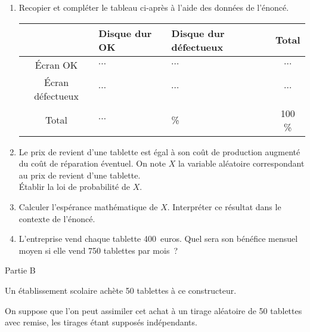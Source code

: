 \begin{enumerate}
     \item %
     Recopier et compléter le tableau ci-après à l'aide des données de l'énoncé.
     \begin{center}
          \begin{extern}%
               \renewcommand\arraystretch{1.5}
               \begin{tabular}{|c|p{2cm}|p{2cm}|c|}
                    \hline
                    $\ $ & \centering Disque dur OK & \centering Disque dur défectueux & Total \\
                    \hline
                    \'Ecran OK & \centering  $\cdots$ & \centering $\cdots$ & $\cdots$ \\
                    \hline
                    \'Ecran défectueux & \centering  $\cdots$ & \centering $\cdots$ & $\cdots$ \\
                    \hline
                    Total & \centering $\cdots$ & \centering 3\% & 100 \% \\
                    \hline
               \end{tabular}
          \end{extern}
     \end{center}
     \item %
     Le prix de revient d'une tablette est égal à son coût de production augmenté du coût de réparation éventuel.
     On note $X$ la variable aléatoire correspondant au prix de revient d'une tablette.\\
     \'Etablir la loi de probabilité de $X$.
     \item %
     Calculer l'espérance mathématique de $X$. Interpréter ce résultat dans le contexte de l'énoncé.
     \item %
     L'entreprise vend chaque tablette 400~euros. Quel sera son bénéfice mensuel moyen si elle vend 750 tablettes par mois~?
\end{enumerate}
%
%
\begin{center}\begin{h3}Partie B \end{h3}\end{center}
%
%
\par
Un établissement scolaire achète 50 tablettes à ce constructeur.
\par
On suppose que l'on peut assimiler cet achat à un tirage aléatoire de 50 tablettes avec remise, les tirages étant supposés indépendants.
\par
